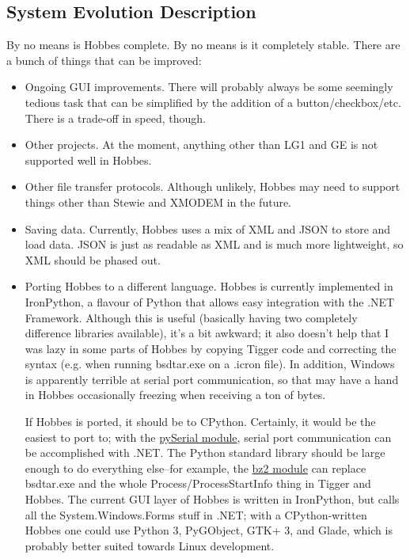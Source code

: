 \documentclass[12pt,letterpaper]{article}
\begin{document}
%
%
\subsection{System Evolution Description}
\label{1.1}

By no means is Hobbes complete. By no means is it completely stable. There are a bunch of things that can be improved:

\begin{itemize}

\item Ongoing GUI improvements. There will probably always be some seemingly tedious task that can be simplified by the addition of a button/checkbox/etc. There is a trade-off in speed, though.

\item Other projects. At the moment, anything other than LG1 and GE is not supported well in Hobbes.

\item Other file transfer protocols. Although unlikely, Hobbes may need to support things other than Stewie and XMODEM in the future.

\item Saving data. Currently, Hobbes uses a mix of XML and JSON to store and load data. JSON is just as readable as XML and is much more lightweight, so XML should be phased out.

\item Porting Hobbes to a different language. Hobbes is currently implemented in IronPython, a flavour of Python that allows easy integration with the .NET Framework. Although this is useful (basically having two completely difference libraries available), it's a bit awkward; it also doesn't help that I was lazy in some parts of Hobbes by copying Tigger code and correcting the syntax (e.g. when running bsdtar.exe on a .icron file). In addition, Windows is apparently terrible at serial port communication, so that may have a hand in Hobbes occasionally freezing when receiving a ton of bytes.

If Hobbes is ported, it should be to CPython. Certainly, it would be the easiest to port to; with the \href{http://pyserial.sourceforge.net/}{pySerial module}, serial port communication can be accomplished with .NET. The Python standard library should be large enough to do everything else--for example, the \href{http://docs.python.org/library/bz2.html}{bz2 module} can replace bsdtar.exe and the whole Process/ProcessStartInfo thing in Tigger and Hobbes. The current GUI layer of Hobbes is written in IronPython, but calls all the System.Windows.Forms stuff in .NET; with a CPython-written Hobbes one could use Python 3, PyGObject, GTK+ 3, and Glade, which is probably better suited towards Linux development.

\end{itemize}
\end{document}
